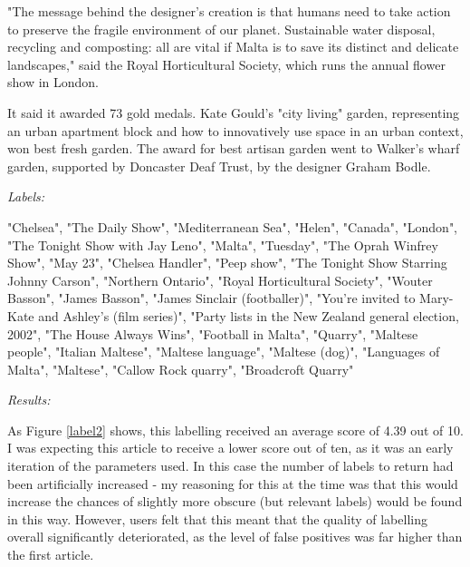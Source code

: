 \documentclass[12pt]{article}
\begin{document}
\begin{mdframed}
"The message behind the designer's creation is that humans need to take action to preserve the fragile environment of our planet. Sustainable water disposal, recycling and composting: all are vital if Malta is to save its distinct and delicate landscapes," said the Royal Horticultural Society, which runs the annual flower show in London.

It said it awarded 73 gold medals. Kate Gould's "city living" garden, representing an urban apartment block and how to innovatively use space in an urban context, won best fresh garden. The award for best artisan garden went to Walker's wharf garden, supported by Doncaster Deaf Trust, by the designer Graham Bodle. \\

\end{mdframed}

\begin{mdframed}

\emph{Labels:}

"Chelsea", "The Daily Show", "Mediterranean Sea", "Helen", "Canada", "London", "The Tonight Show with Jay Leno", "Malta", "Tuesday", "The Oprah Winfrey Show", "May 23", "Chelsea Handler", "Peep show", "The Tonight Show Starring Johnny Carson", "Northern Ontario", "Royal Horticultural Society", "Wouter Basson", "James Basson", "James Sinclair (footballer)", "You're invited to Mary-Kate and Ashley's (film series)", "Party lists in the New Zealand general election, 2002", "The House Always Wins", "Football in Malta", "Quarry", "Maltese people", "Italian Maltese", "Maltese language", "Maltese (dog)", "Languages of Malta", "Maltese", "Callow Rock quarry", "Broadcroft Quarry"  \\

\end{mdframed}

\emph{Results:}

As Figure \ref{label2} shows, this labelling received an average score of 4.39 out of 10. I was expecting this article to receive a lower score out of ten, as it was an early iteration of the parameters used. In this case the number of labels to return had been artificially increased - my reasoning for this at the time was that this would increase the chances of slightly more obscure (but relevant labels) would be found in this way. However, users felt that this meant that the quality of labelling overall significantly deteriorated, as the level of false positives was far higher than the first article.
\end{document}
